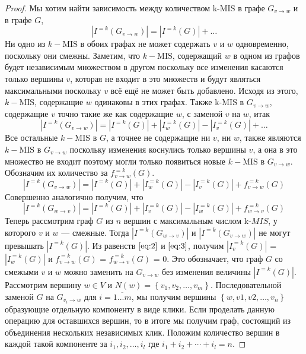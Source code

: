 \documentclass[12pt]{article}
\begin{document}
\begin{proof}
	Мы хотим найти зависимость между количеством k-$\text{MIS}$ в графе $G_{v\to w}$ и в графе $G$,
	$$\left| I^{=k}\left(G_{v \to w}\right) \right| = \left| I^{=k}\left(G\right) \right| + \dots$$ 
	Ни одно из $k-\text{MIS}$ в обоих графах не может содержать $v$ и $w$ одновременно, поскольку они смежны. Заметим, что $k-\text{MIS}$, содержащий $w$ в одном из графов будет независимым множеством в другом поскольку все изменения касаются только вершины $v$, которая не входит в это множеств и будут являться максимальными поскольку $v$ всё ещё не может быть добавлено. Исходя из этого, $k-\text{MIS}$, содержащие $w$ одинаковы в этих графах. Также k-$\text{MIS}$ в $G_{v \to w}$, содержащие $v$ точно такие же как содержащие $w$, с заменой $v$ на $w$, итак
	$$\left| I^{=k}\left(G_{v \to w}\right) \right| = \left| I^{=k}\left(G\right) \right| + \left| I^{=k}_w\left(G\right) \right| - \left|I^{=k}_v\left(G\right)\right| + \dots$$
	Все остальные $k-\text{MIS}$ в $G$, а точнее не содержащие ни $v$, ни $w$, также являются $k-\text{MIS}$ в $G_{v \to w}$ поскольку изменения коснулись только вершины $v$, а она в это множество не входит поэтому могли только появиться новые $k-\text{MIS}$ в $G_{v \to w}$. Обозначим их количество за $f^{=k}_{v \to w}\left(G\right)$.
	\begin{equation}\label{eq:2}
	    \left| I^{=k}\left(G_{v \to w}\right) \right| = \left| I^{=k}\left(G\right) \right| + \left| I^{=k}_w\left(G\right) \right| - \left|I^{=k}_v\left(G\right)\right| + f^{=k}_{v \to w}\left(G\right)
	\end{equation}
	Совершенно аналогично получим, что 
	\begin{equation}\label{eq:3}
	    \left| I^{=k}\left(G_{w \to v}\right) \right| = \left| I^{=k}\left(G\right) \right| + \left| I^{=k}_v\left(G\right) \right| - \left|I^{=k}_w\left(G\right)\right| + f^{=k}_{w \to v}\left(G\right)
	\end{equation}
	Теперь рассмотрим граф $G$ из $n$ вершин с максимальным числом k-$MIS$, у которого $v$ и $w$ --- смежные. Тогда $\left| I^{=k}\left(G_{w \to v}\right) \right|$ и $\left| I^{=k}\left(G_{v \to w}\right) \right|$ не могут превышать $\left| I^{=k}\left(G\right) \right|$. Из равенств $\eqref{eq:2}$ и $\eqref{eq:3}$, получим $\left| I^{=k}_v\left(G\right) \right|$ = $\left|I^{=k}_w\left(G\right)\right|$ и $f^{=k}_{v \to w}\left(G\right)$ = $f^{=k}_{w \to v}\left(G\right)$ = 0. Это обозначает, что граф $G$ со смежыми $v$ и $w$ можно заменить на $G_{v \to w}$ без изменения величины $\left| I^{=k}\left(G\right) \right|$. Рассмотрим вершину $w \in V$ и $N\left(w\right) = \left\{v_1, v_2, \dots, v_m \right\}$. По\-сле\-до\-ва\-тель\-ной заменой $G$ на $G_{v_i \to w}$ для $i = \overline{1...m}$, мы получим вершины $\left\{w, v1, v2, \dots, v_n\right\}$ образующие отдельную компоненту в виде клики. Если проделать данную операцию для оставшихся вершин, то в итоге мы получим граф, состоящий из объединения нескольких независимых клик. Положим количество вершин в каждой такой компоненте за $i_1, i_2, \dots, i_l$ где $i_1 + i_2 + \cdots + i_l = n$.

\end{proof}
\end{document}
